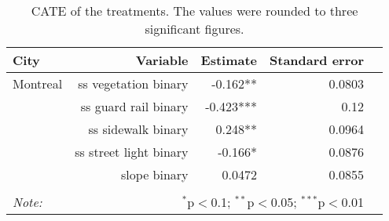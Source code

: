 \begin{table}[!htp]\centering
\caption{CATE of the treatments. The values were rounded to three significant figures.}\label{result:tab:cf}
\scriptsize
\begin{tabular}{lrrrr}\toprule
City&Variable&Estimate &Standard error \\ \midrule
Montreal & ss vegetation binary & -0.162** & 0.0803 \\
 & ss guard rail binary & -0.423*** & 0.12 \\
 & ss sidewalk binary & 0.248** & 0.0964 \\
 & ss street light binary & -0.166* & 0.0876 \\
 & slope binary & 0.0472 & 0.0855 \\
\hline
\hline \\[-1.8ex]
\textit{Note:}  & \multicolumn{3}{r}{$^{*}$p$<$0.1; $^{**}$p$<$0.05; $^{***}$p$<$0.01} \\
\end{tabular}
\end{table}
